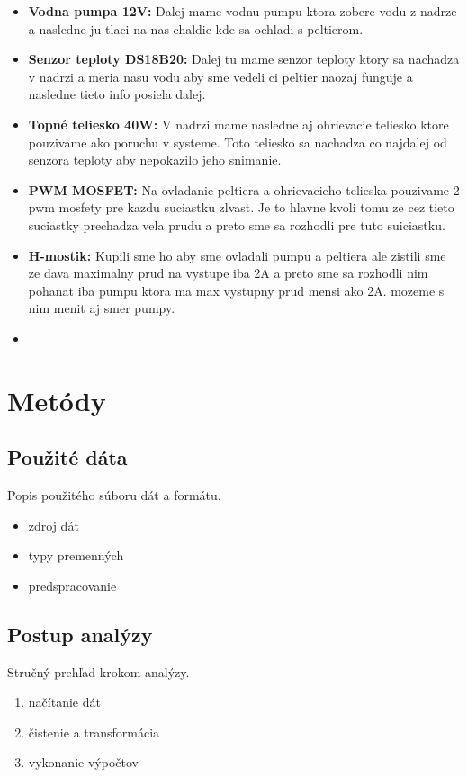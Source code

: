\begin{itemize}
  \item \textbf{Vodna pumpa 12V: } Dalej mame vodnu pumpu ktora zobere vodu z nadrze a nasledne ju tlaci na nas chaldic kde sa ochladi s peltierom.
  \item \textbf{Senzor teploty DS18B20: } Dalej tu mame senzor teploty ktory sa nachadza v nadrzi a meria nasu vodu aby sme vedeli ci peltier naozaj funguje a nasledne tieto info posiela dalej.
  \item \textbf{Topné teliesko 40W: } V nadrzi mame nasledne aj ohrievacie teliesko ktore pouzivame ako poruchu v systeme. Toto teliesko sa nachadza co najdalej od senzora teploty aby nepokazilo jeho snimanie.
  \item \textbf{PWM MOSFET: } Na ovladanie peltiera a ohrievacieho telieska pouzivame 2 pwm mosfety pre kazdu suciastku zlvast. Je to hlavne kvoli tomu ze cez tieto suciastky prechadza vela prudu a preto sme sa rozhodli pre tuto suiciastku.
  \item \textbf{H-mostik: } Kupili sme ho aby sme ovladali pumpu a peltiera ale zistili sme ze dava maximalny prud na vystupe iba 2A a preto sme sa rozhodli nim pohanat iba pumpu ktora ma max vystupny prud mensi ako 2A. mozeme s nim menit aj smer pumpy.
  \item 
\end{itemize}

\section{Metódy}
\subsection{Použité dáta}
Popis použitého súboru dát a formátu.
\begin{itemize}
  \item zdroj dát
  \item typy premenných
  \item predspracovanie
\end{itemize}

\subsection{Postup analýzy}
Stručný prehľad krokom analýzy.
\begin{enumerate}
  \item načítanie dát
  \item čistenie a transformácia
  \item vykonanie výpočtov
\end{enumerate}

